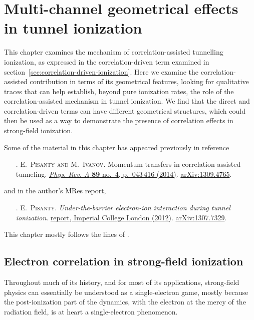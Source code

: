 


\chapter{Multi-channel geometrical effects in tunnel ionization}
\label{chap:multi-channel}
This chapter examines the mechanism of correlation-assisted tunnelling ionization, as expressed in the correlation-driven term examined in section~\ref{sec:correlation-driven-ionization}. Here we examine the correlation-assisted contribution in terms of its geometrical features, looking for qualitative traces that can help establish, beyond pure ionization rates, the role of the correlation-assisted mechanism in tunnel ionization. We find that the direct and correlation-driven terms can have different geometrical structures, which could then be used as a way to demonstrate the presence of correlation effects in strong-field ionization. 

Some of the material in this chapter has appeared previously in reference
\begin{enumerate}
\item[{\hypersetup{citecolor=black}\citealp{Pisanty_momentum_transfers_2014}}.]
\textsc{E.~Pisanty and M.~Ivanov}.
\newblock Momentum transfers in correlation-assisted
  tunneling.
\newblock \href{http://dx.doi.org/10.1103/PhysRevA.89.043416}{
          \emph{Phys. Rev. A} \textbf{89} no.~4, p.~043\,416 (2014)}.
\newblock \href{http://arxiv.org/abs/1309.4765}{{arXiv}:1309.4765}.
\end{enumerate}
\noindent
and in the author's MRes report,
\begin{enumerate}
\item[{\hypersetup{citecolor=black}\citealp{MResReport}}.]
\textsc{E.~Pisanty}.
\newblock \emph{Under-the-barrier electron-ion interaction during tunnel
  ionization}. 
  \href{http://www3.imperial.ac.uk/controlledquantumdynamics/people/students/cohortthree/emiliopisantyalatorre }{
 report, Imperial College London (2012)}.
\newblock \href{http://arxiv.org/abs/1307.7329}{arXiv:1307.7329}.
\end{enumerate}
\noindent
This chapter mostly follows the lines of .



\section{Electron correlation in strong-field ionization}
Throughout much of its history, and for most of its applications, strong-field physics can essentially be understood as a single-electron game, mostly because the post-ionization part of the dynamics, with the electron at the mercy of the radiation field, is at heart a single-electron phenomenon. 

